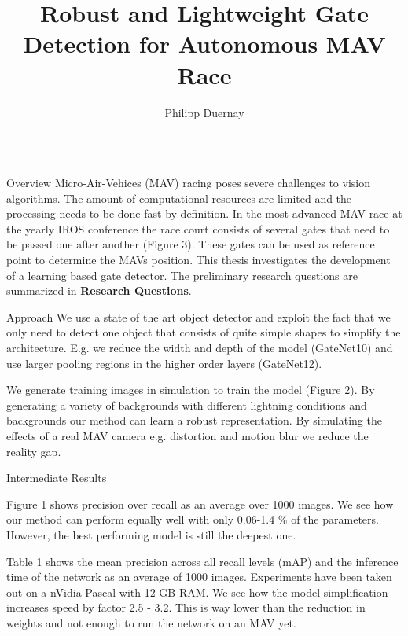 \documentclass{beamer}
\author[p.duernay@protonmail.com]{Philipp Duernay}
\title{Robust and Lightweight Gate Detection for Autonomous MAV Race}
\institute{TU Delft}
\begin{document}
\begin{frame}[fragile]
\begin{columns}[T]

\begin{column}{.33\textwidth}

	
\begin{block}{Overview}
 Micro-Air-Vehices (MAV) racing poses severe challenges to vision algorithms. The amount of computational resources are limited and the processing needs to be done fast by definition. In the most advanced MAV race at the yearly IROS conference the race court consists of several gates that need to be passed one after another (Figure 3). These gates can be used as reference point to determine the MAVs position. This thesis investigates the development of a learning based gate detector. The preliminary research questions are summarized in \textbf{Research Questions}.

\end{block}

\begin{block}{Approach}
	\label{box::method}
	We use a state of the art object detector \cite{Redmon} and exploit the fact that we only need to detect one object that consists of quite simple shapes to simplify the architecture. E.g. we reduce the width and depth of the model (GateNet10) and use larger pooling regions in the higher order layers (GateNet12).
	
	We generate training images in simulation to train the model (Figure 2). By generating a variety of backgrounds with different lightning conditions and backgrounds our method can learn a robust representation. By simulating the effects of a real MAV camera e.g. distortion and motion blur we reduce the reality gap. 
\end{block}

\begin{block}{Intermediate Results}
	
	Figure 1 shows precision over recall as an average over 1000 images. We see how our method can perform equally well with only 0.06-1.4 \% of the parameters. However, the best performing model is still the deepest one. 
	
	Table 1 shows the mean precision across all recall levels (mAP) and the inference time of the network as an average of 1000 images. Experiments have been taken out on a nVidia Pascal with 12 GB RAM. We see how the model simplification increases speed by factor 2.5 - 3.2. This is way lower than the reduction in weights and not enough to run the network on an MAV yet.


\end{block}
\end{column}
\end{columns}
\end{frame}
\end{document}
